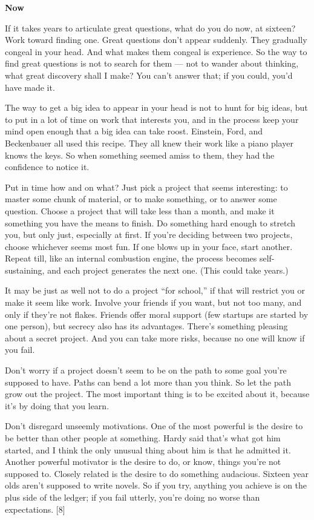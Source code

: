 \textbf{Now}

If it takes years to articulate great questions, what do you do now, at
sixteen? Work toward finding one. Great questions don't appear suddenly.
They gradually congeal in your head. And what makes them congeal is
experience. So the way to find great questions is not to search for them
--- not to wander about thinking, what great discovery shall I make? You
can't answer that; if you could, you'd have made it.

The way to get a big idea to appear in your head is not to hunt for big
ideas, but to put in a lot of time on work that interests you, and in
the process keep your mind open enough that a big idea can take roost.
Einstein, Ford, and Beckenbauer all used this recipe. They all knew
their work like a piano player knows the keys. So when something seemed
amiss to them, they had the confidence to notice it.

Put in time how and on what? Just pick a project that seems interesting:
to master some chunk of material, or to make something, or to answer
some question. Choose a project that will take less than a month, and
make it something you have the means to finish. Do something hard enough
to stretch you, but only just, especially at first. If you're deciding
between two projects, choose whichever seems most fun. If one blows up
in your face, start another. Repeat till, like an internal combustion
engine, the process becomes self-sustaining, and each project generates
the next one. (This could take years.)

It may be just as well not to do a project ``for school,'' if that will
restrict you or make it seem like work. Involve your friends if you
want, but not too many, and only if they're not flakes. Friends offer
moral support (few startups are started by one person), but secrecy also
has its advantages. There's something pleasing about a secret project.
And you can take more risks, because no one will know if you fail.

Don't worry if a project doesn't seem to be on the path to some goal
you're supposed to have. Paths can bend a lot more than you think. So
let the path grow out the project. The most important thing is to be
excited about it, because it's by doing that you learn.

Don't disregard unseemly motivations. One of the most powerful is the
desire to be better than other people at something. Hardy said that's
what got him started, and I think the only unusual thing about him is
that he admitted it. Another powerful motivator is the desire to do, or
know, things you're not supposed to. Closely related is the desire to do
something audacious. Sixteen year olds aren't supposed to write novels.
So if you try, anything you achieve is on the plus side of the ledger;
if you fail utterly, you're doing no worse than expectations. {[}8{]}

